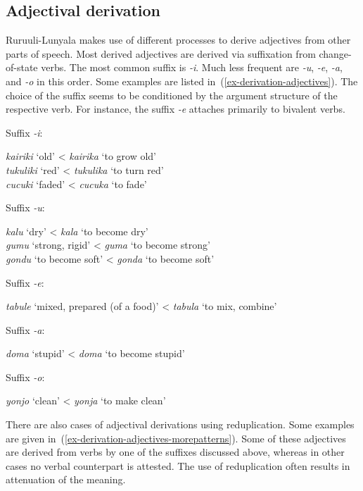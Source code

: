 \subsection{Adjectival derivation} \label{sec-derivation-adjective}

Ruruuli-Lunyala makes use of different processes to derive adjectives from other parts of speech. 
Most derived adjectives are derived via suffixation from change-of-state verbs. 
The most common suffix is  \textit{-i}. 
Much less frequent are  \textit{-u},  \textit{-e},  \textit{-a}, and  \textit{-o} in this order. 
Some examples are listed in~(\ref{ex-derivation-adjectives}). 
The choice of the suffix seems to be conditioned by the argument structure of the respective verb. 
For instance, the suffix  \textit{-e} attaches primarily to bivalent verbs. 

\ea \label{ex-derivation-adjectives}
\begin{xlist}
\ex	Suffix  \textit{-i}:

 \textit{kairiki} `old' <  \textit{kairika} `to grow old'\\
	\textit{tukuliki} `red' < \textit{tukulika} `to turn red'\\
	\textit{cucuki} `faded' < \textit{cucuka} `to fade'

\ex Suffix \textit{-u}:

\textit{kalu} `dry' < \textit{kala} `to become dry'\\
\textit{gumu} `strong, rigid' < \textit{guma} `to become strong'\\
\textit{gondu} `to become soft' < \textit{gonda} `to become soft' 

\ex Suffix \textit{-e}:

\textit{tabule} `mixed, prepared (of a food)' < \textit{tabula} `to mix, combine' 

\ex Suffix \textit{-a}:

\textit{doma} `stupid' < \textit{doma} `to become stupid'

\ex Suffix \textit{-o}:

\textit{yonjo} `clean' < \textit{yonja} `to make clean' 
\end{xlist}
\z

There are also cases of adjectival derivations using reduplication. 
Some examples are given in~(\ref{ex-derivation-adjectives-morepatterns}). 
Some of these adjectives are derived from verbs by one of the suffixes discussed above, whereas in other cases no verbal counterpart is attested. 
The use of reduplication often results in attenuation of the meaning.

